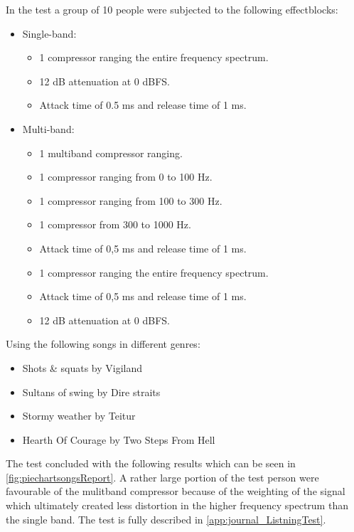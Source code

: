 In the test a group of 10 people were subjected to the following effectblocks:
 \begin{itemize}
    \item Single-band:
    \begin{itemize}
    \item 1 compressor ranging the entire frequency spectrum.
    \item 12 dB attenuation at 0 dBFS.
    \item Attack time of 0.5 ms and release time of 1 ms.
    \end{itemize}
    \item Multi-band:
    \begin{itemize}
    \item 1 multiband compressor ranging.
    \item 1 compressor ranging from 0 to 100 Hz.
    \item 1 compressor ranging from 100 to 300 Hz.
    \item 1 compressor from 300 to 1000 Hz.
    \item Attack time of 0,5 ms and release time of 1 ms.
    \item 1 compressor ranging the entire frequency spectrum.
    \item Attack time of 0,5 ms and release time of 1 ms.
    \item 12 dB attenuation at 0 dBFS.
    \end{itemize}
 \end{itemize}
Using the following songs in different genres:
\begin{itemize}
\item Shots \& squats by Vigiland
\item Sultans of swing by Dire straits
\item Stormy weather by Teitur
\item Hearth Of Courage by Two Steps From Hell
\end{itemize}
The test concluded with the following results which can be seen in \autoref{fig:piechartsongsReport}. A rather large portion of the test person were favourable of the mulitband compressor because of the weighting of the signal which ultimately created less distortion in the higher frequency spectrum than the single band. The test is fully described in \autoref{app:journal_ListningTest}.

